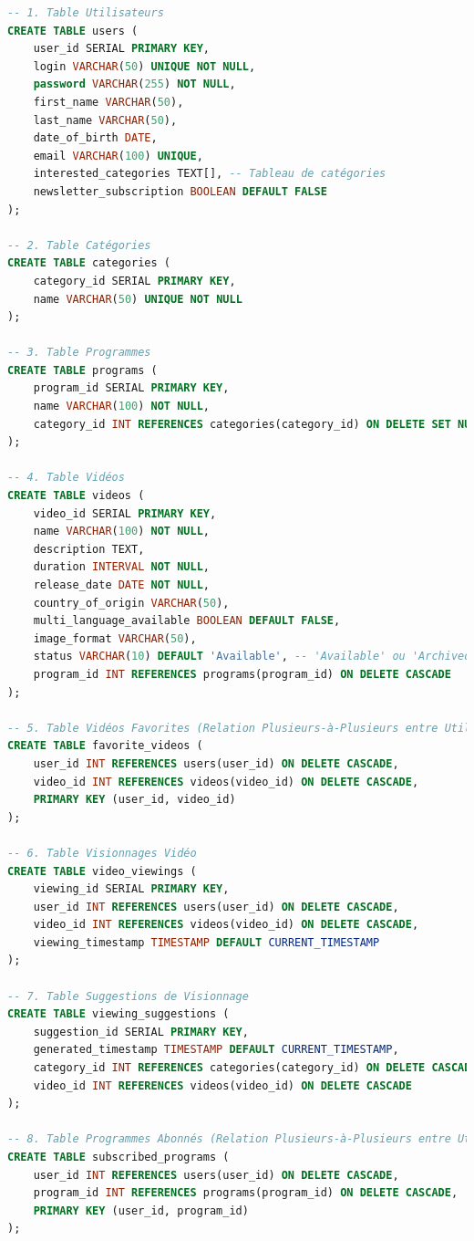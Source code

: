 \documentclass{article}
\begin{document}
\begin{lstlisting}[language=SQL]
-- 1. Table Utilisateurs
CREATE TABLE users (
    user_id SERIAL PRIMARY KEY,
    login VARCHAR(50) UNIQUE NOT NULL,
    password VARCHAR(255) NOT NULL,
    first_name VARCHAR(50),
    last_name VARCHAR(50),
    date_of_birth DATE,
    email VARCHAR(100) UNIQUE,
    interested_categories TEXT[], -- Tableau de catégories
    newsletter_subscription BOOLEAN DEFAULT FALSE
);

-- 2. Table Catégories
CREATE TABLE categories (
    category_id SERIAL PRIMARY KEY,
    name VARCHAR(50) UNIQUE NOT NULL
);

-- 3. Table Programmes
CREATE TABLE programs (
    program_id SERIAL PRIMARY KEY,
    name VARCHAR(100) NOT NULL,
    category_id INT REFERENCES categories(category_id) ON DELETE SET NULL
);

-- 4. Table Vidéos
CREATE TABLE videos (
    video_id SERIAL PRIMARY KEY,
    name VARCHAR(100) NOT NULL,
    description TEXT,
    duration INTERVAL NOT NULL,
    release_date DATE NOT NULL,
    country_of_origin VARCHAR(50),
    multi_language_available BOOLEAN DEFAULT FALSE,
    image_format VARCHAR(50),
    status VARCHAR(10) DEFAULT 'Available', -- 'Available' ou 'Archived'
    program_id INT REFERENCES programs(program_id) ON DELETE CASCADE
);

-- 5. Table Vidéos Favorites (Relation Plusieurs-à-Plusieurs entre Utilisateurs et Vidéos)
CREATE TABLE favorite_videos (
    user_id INT REFERENCES users(user_id) ON DELETE CASCADE,
    video_id INT REFERENCES videos(video_id) ON DELETE CASCADE,
    PRIMARY KEY (user_id, video_id)
);

-- 6. Table Visionnages Vidéo
CREATE TABLE video_viewings (
    viewing_id SERIAL PRIMARY KEY,
    user_id INT REFERENCES users(user_id) ON DELETE CASCADE,
    video_id INT REFERENCES videos(video_id) ON DELETE CASCADE,
    viewing_timestamp TIMESTAMP DEFAULT CURRENT_TIMESTAMP
);

-- 7. Table Suggestions de Visionnage
CREATE TABLE viewing_suggestions (
    suggestion_id SERIAL PRIMARY KEY,
    generated_timestamp TIMESTAMP DEFAULT CURRENT_TIMESTAMP,
    category_id INT REFERENCES categories(category_id) ON DELETE CASCADE,
    video_id INT REFERENCES videos(video_id) ON DELETE CASCADE
);

-- 8. Table Programmes Abonnés (Relation Plusieurs-à-Plusieurs entre Utilisateurs et Programmes)
CREATE TABLE subscribed_programs (
    user_id INT REFERENCES users(user_id) ON DELETE CASCADE,
    program_id INT REFERENCES programs(program_id) ON DELETE CASCADE,
    PRIMARY KEY (user_id, program_id)
);
\end{lstlisting}
\end{document}
